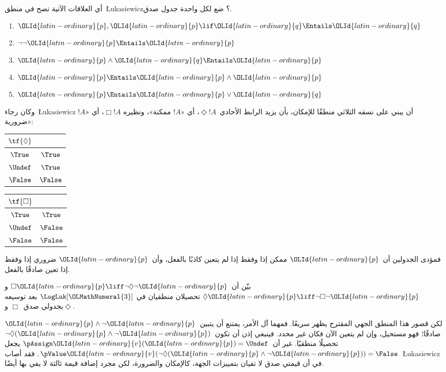 \documentclass[../../../include/open-logic-section]{subfiles}
\begin{document}
\begin{prob}
  أي العلاقات الآتية تصح في منطق~\L ukasiewicz؟ ضع لكل واحدة جدول صدق.
  \begin{enumerate}
    \item $\OLId{latin-ordinary}{p}, \OLId{latin-ordinary}{p} \lif \OLId{latin-ordinary}{q} \Entails \OLId{latin-ordinary}{q}$
    \item $\lnot\lnot \OLId{latin-ordinary}{p} \Entails \OLId{latin-ordinary}{p}$
    \item $\OLId{latin-ordinary}{p} \land \OLId{latin-ordinary}{q} \Entails \OLId{latin-ordinary}{p}$
    \item $\OLId{latin-ordinary}{p} \Entails \OLId{latin-ordinary}{p} \land \OLId{latin-ordinary}{p}$
    \item $\OLId{latin-ordinary}{p} \Entails \OLId{latin-ordinary}{p} \lor \OLId{latin-ordinary}{q}$
  \end{enumerate}
\end{prob}

وكان رجاء~\L ukasiewicz أن يبني على نسقه الثلاثي منطقًا للإمكان،
بأن يزيد الرابط الأحادي~$\Diamond !A$، أي «$!A$ ممكنة»، ونظيره
$\Box !A$، أي «$!A$ ضرورية»:
\begin{center}
  \begin{tabular}{c|c}
    $\tf{\Diamond}$ & \\
    \hline
    $\True$ & $\True$ \\
    $\Undef$ & $\True$ \\
    $\False$ & $\False$
  \end{tabular}
  \quad
  \begin{tabular}{c|c}
    $\tf{\Box}$ & \\
    \hline
    $\True$ & $\True$ \\
    $\Undef$ & $\False$ \\
    $\False$ & $\False$
  \end{tabular}
\end{center}
فمؤدى الجدولين أن~$\OLId{latin-ordinary}{p}$ ممكن إذا وفقط إذا لم يتعين كاذبًا بالفعل،
وأن~$\OLId{latin-ordinary}{p}$ ضروري إذا وفقط إذا تعين صادقًا بالفعل.

\begin{prob}
  بيّن أن~$\Box \OLId{latin-ordinary}{p} \liff \lnot\Diamond \lnot \OLId{latin-ordinary}{p}$ و
  $\Diamond \OLId{latin-ordinary}{p} \liff \lnot \Box \lnot \OLId{latin-ordinary}{p}$ تحصيلان منطقيان في
  $\LogLuk[\OLMathNumeral{3}]$ بعد توسيعه بجدولي صدق~$\Box$ و$\Diamond$.
\end{prob}

لكن قصور هذا المنطق الجهي المقترح يظهر سريعًا. فمهما آل الأمر، يمتنع
أن يتبين~$\OLId{latin-ordinary}{p} \land \lnot \OLId{latin-ordinary}{p}$ صادقًا؛ فهو مستحيل، وإن لم يتعين الآن
فكان غير محدد. فينبغي إذن أن تكون~$\lnot \Diamond(\OLId{latin-ordinary}{p} \land \lnot \OLId{latin-ordinary}{p})$
تحصيلًا منطقيًا. غير أن~$\pAssign \OLId{latin-ordinary}{v}(\OLId{latin-ordinary}{p}) = \Undef$ يجعل
$\pValue \OLId{latin-ordinary}{v}(\lnot \Diamond(\OLId{latin-ordinary}{p} \land \lnot \OLId{latin-ordinary}{p})) = \False$.
فقد أصاب~\L ukasiewicz في أن قيمتي صدق لا تفيان بتمييزات الجهة،
كالإمكان والضرورة، لكن مجرد إضافة قيمة ثالثة لا يفي بها أيضًا.
\end{document}
